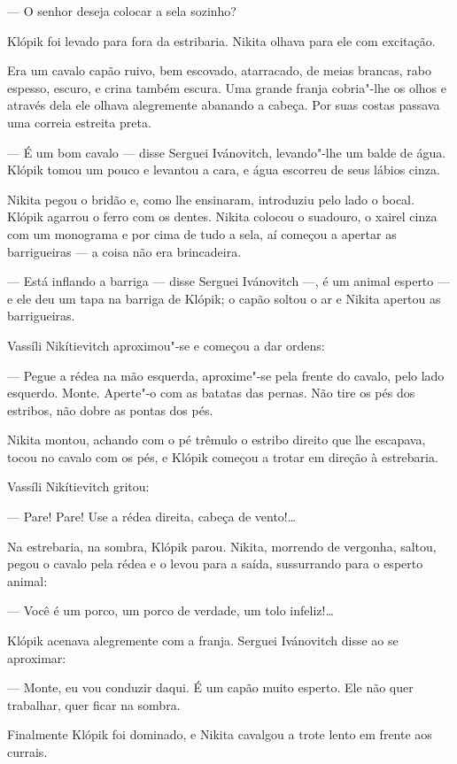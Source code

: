 --- O senhor deseja colocar a sela sozinho?

Klópik foi levado para fora da estribaria. Nikita olhava para ele com
excitação.

Era um cavalo capão ruivo, bem escovado, atarracado, de meias brancas,
rabo espesso, escuro, e crina também escura. Uma grande franja
cobria"-lhe os olhos e através dela ele olhava alegremente abanando
a cabeça. Por suas costas passava uma correia estreita preta.

--- É um bom cavalo --- disse Serguei Ivánovitch, levando"-lhe um balde
de água. Klópik tomou um pouco e levantou a cara, e água escorreu de
seus lábios cinza.

Nikita pegou o bridão e, como lhe ensinaram, introduziu pelo lado o
bocal. Klópik agarrou o ferro com os dentes. Nikita colocou o suadouro,
o xairel cinza com um monograma e por cima de tudo a sela, aí começou
a apertar as barrigueiras --- a coisa não era brincadeira.

--- Está inflando a barriga --- disse Serguei Ivánovitch ---, é um
animal esperto --- e ele deu um tapa na barriga de Klópik; o capão
soltou o ar e Nikita apertou as barrigueiras.

Vassíli Nikítievitch aproximou"-se e começou a dar ordens:

--- Pegue a rédea na mão esquerda, aproxime"-se pela frente do cavalo,
pelo lado esquerdo. Monte. Aperte"-o com as batatas das pernas. Não tire
os pés dos estribos, não dobre as pontas dos pés.

Nikita montou, achando com o pé trêmulo o estribo direito que lhe
escapava, tocou no cavalo com os pés, e Klópik começou a trotar em
direção à estrebaria.

Vassíli Nikítievitch gritou:

--- Pare! Pare! Use a rédea direita, cabeça de vento!\ldots{}

Na estrebaria, na sombra, Klópik parou. Nikita, morrendo de vergonha,
saltou, pegou o cavalo pela rédea e o levou para a saída, sussurrando
para o esperto animal:

--- Você é um porco, um porco de verdade, um tolo infeliz!\ldots{}

Klópik acenava alegremente com a franja. Serguei Ivánovitch disse ao se
aproximar:

--- Monte, eu vou conduzir daqui. É um capão muito esperto. Ele não quer
trabalhar, quer ficar na sombra.

Finalmente Klópik foi dominado, e Nikita cavalgou a trote lento em
frente aos currais.

